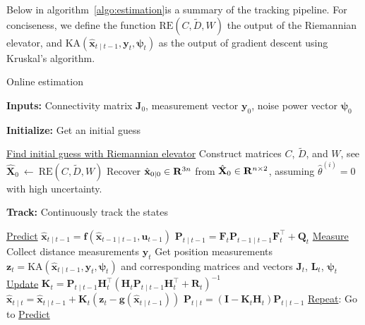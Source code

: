 
Below in algorithm~\ref{algo:estimation}is a summary of the tracking pipeline. For conciseness, we define the function $\text{RE}(C, \tilde{D}, W)$ the output of the Riemannian elevator, and $\text{KA}(\hat{\mathbf{x}}_{t \mid t-1}, \mathbf{y}_t, \bm{\psi}_t)$ as the output of gradient descent using Kruskal's algorithm. 

\begin{algorithm}[ht]
    \caption{Online estimation}\label{algo:estimation}
    \textbf{Inputs:} Connectivity matrix $\mathbf{J}_0$, measurement vector $\mathbf{y}_0$, noise power vector $\bm{\psi}_0$
    
    \textbf{Initialize:} Get an initial guess
    \begingroup{} %
    \begin{algorithmic}[1]
        \Statex \underline{Find initial guess with Riemannian elevator}
        \State Construct matrices $C$, $\tilde{D}$, and $W$, see \cite{R_elevator}
        \State $\hat{\mathbf{X}}_0 \ \leftarrow\ \text{RE}(C, \tilde{D}, W)$
        \State Recover $\hat{\mathbf{x}}_{0 \mid 0} \in \mathbf{R}^{3n}$ from $\hat{\mathbf{X}}_0 \in \mathbf{R}^{n \times 2}$, assuming $\hat{\theta}^{(i)} = 0$ with high uncertainty.
    \end{algorithmic}

    \textbf{Track:} Continuously track the states
    \begin{algorithmic}[1]
        \Statex \underline{Predict}
        \State $\hat{\mathbf{x}}_{t \mid t-1} = \mathbf{f}(\hat{\mathbf{x}}_{t-1 \mid t-1}, \mathbf{u}_{t-1})$
        \State $\mathbf{P}_{t \mid t-1} = \mathbf{F}_t \mathbf{P}_{t-1 \mid t-1} \mathbf{F}_t^\top + \mathbf{Q}_t$
        \Statex \underline{Measure}
        \State Collect distance measurements $\mathbf{y}_t$
        \State Get position measurements $\mathbf{z}_t = \text{KA}(\hat{\mathbf{x}}_{t \mid t-1}, \mathbf{y}_t, \bm{\psi}_t)$ and corresponding matrices and vectors $\mathbf{J}_t$, $\mathbf{L}_t$, $\bm{\psi}_t$
        \Statex \underline{Update}
        \State $\mathbf{K}_t = \mathbf{P}_{t \mid t-1} \mathbf{H}^\top_t (\mathbf{H}_t \mathbf{P}_{t \mid t-1} \mathbf{H}_t^\top + \mathbf{R}_t)^{-1}$
        \State $\hat{\mathbf{x}}_{t \mid t} = \hat{\mathbf{x}}_{t\mid t-1} + \mathbf{K}_t (\mathbf{z}_t - \mathbf{g}(\hat{\mathbf{x}}_{t \mid t-1}))$
        \State $\mathbf{P}_{t \mid t} = (\mathbf{I} - \mathbf{K}_t \mathbf{H}_t) \mathbf{P}_{t \mid t-1}$
        \Statex \underline{Repeat}: Go to \underline{Predict}
    \end{algorithmic}
    \endgroup
\end{algorithm}